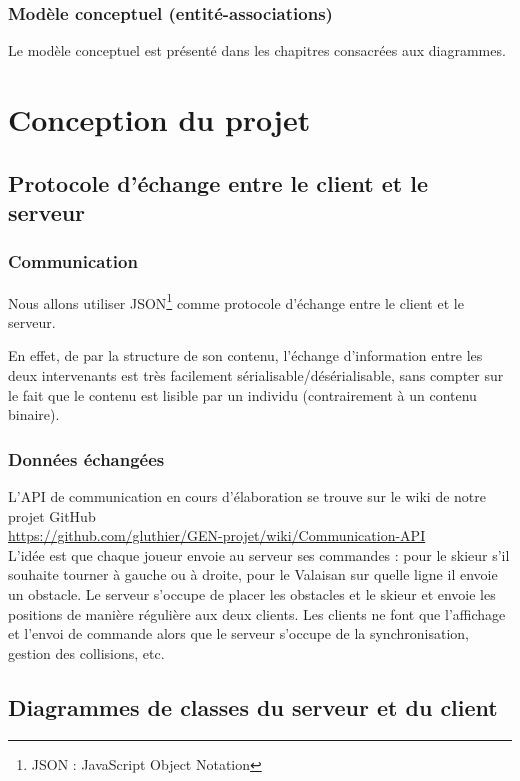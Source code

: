 \documentclass[a4paper,12pt]{article}
\begin{document}
	\subsubsection{Modèle conceptuel (entité-associations)}
	Le modèle conceptuel est présenté dans les chapitres consacrées aux diagrammes.
	
	\section{Conception du projet}
	
	
	\subsection{Protocole d'échange entre le client et le serveur}
	\subsubsection{Communication}
	Nous allons utiliser JSON\footnote{JSON : JavaScript Object Notation} comme protocole d'échange entre le client et le serveur. \par
	En effet, de par la structure de son contenu, l'échange d'information entre les deux intervenants est très facilement sérialisable/désérialisable, sans compter sur le fait que le contenu est lisible par un individu (contrairement à un contenu binaire).
	
	\subsubsection{Données échangées}
	L'API de communication en cours d'élaboration se trouve sur le wiki de notre projet GitHub \\ \url{https://github.com/gluthier/GEN-projet/wiki/Communication-API} \\
	L'idée est que chaque joueur envoie au serveur ses commandes : pour le skieur s'il souhaite tourner à gauche ou à droite, pour le Valaisan sur quelle ligne il envoie un obstacle. Le serveur s'occupe de placer les obstacles et le skieur et envoie les positions de manière régulière aux deux clients. Les clients ne font que l'affichage et l'envoi de commande alors que le serveur s'occupe de la synchronisation, gestion des collisions, etc.
	
	
	\subsection{Diagrammes de classes du serveur et du client}
	
\end{document}
